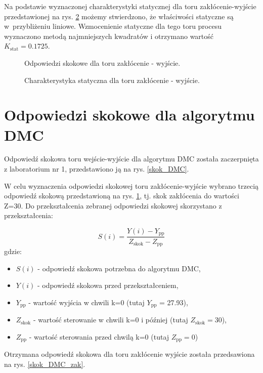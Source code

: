 \documentclass[a4paper,titlepage,11pt,twosides,floatssmall]{mwrep}
\begin{document}
Na podstawie wyznaczonej charakterystyki statycznej dla toru zakłócenie-wyjście przedstawionej na rys. \ref{char_skok_zak} możemy stwierdzono, że właściwości statyczne są w~przybliżeniu liniowe. Wzmocenienie statyczne dla tego toru procesu wyznaczono metodą najmniejszych kwadratów i otrzymano wartość $K_{\mathrm{stat}}=0.1725$.

\begin{figure}[H]
	\centering
	
	\caption{Odpowiedzi skokowe dla toru zakłócenie - wyjście.}
	\label{skok_zak}
\end{figure}

\begin{figure}[H]
	\centering
	
	\caption{Charakterystyka statyczna dla toru zakłócenie - wyjście.}
	\label{char_skok_zak}
\end{figure}

\section{Odpowiedzi skokowe dla algorytmu DMC}
Odpowiedź skokowa toru wejście-wyjście dla algorytmu DMC została zaczerpnięta z laboratorium nr 1, przedstawiono ją na rys. \ref{skok_DMC}.

W celu wyznaczenia odpowiedzi skokowej toru zakłócenie-wyjście wybrano trzecią odpowiedź skokową przedstawioną na rys. \ref{skok_zak}, tj. skok zakłócenia do wartości Z=30. Do przekształcenia zebranej odpowiedzi skokowej skorzystano z przekształcenia:

\begin{equation}
	S(i)= \frac{Y(i) - Y_{\mathrm{pp}}}{Z_{\mathrm{skok}} - Z_{\mathrm{pp}}}
\end{equation}
gdzie:
\begin{itemize}
  \item $S(i)$ - odpowiedź skokowa potrzebna do algorytmu DMC,
	\item $Y(i)$ - odpowiedź skokowa przed przekształceniem,
	\item $Y_{\mathrm{pp}}$ - wartość wyjścia w chwili k=0 (tutaj $Y_{\mathrm{pp}}$  = \num{27.93}),
	\item $Z_{\mathrm{skok}}$ - wartość sterowanie w chwili k=0 i później (tutaj $Z_{\mathrm{skok}} = 30$),
	\item $Z_{\mathrm{pp}}$ - wartość sterowania przed chwilą k=0 (tutaj $Z_{\mathrm{pp}} = 0$)
\end{itemize}

Otrzymana odpowiedź skokowa dla toru zakłócenie wyjście została przedsawiona na rys. \ref{skok_DMC_zak}.
\end{document}

